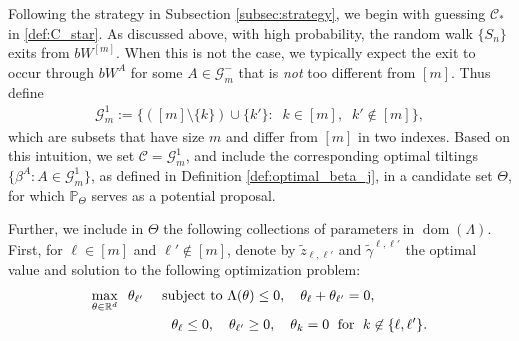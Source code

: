 \documentclass[aap,preprint]{imsart}
\newcommand{\Mstar}{[m]}
\newcommand{\Pro}{{\mathbb{P}}}
\newcommand{\bR}{{\mathbb{R}}}
\theoremstyle{plain}
\theoremstyle{definition}
\begin{document}
Following the strategy in Subsection \ref{subsec:strategy}, we begin with guessing $\mathcal{C}_*$ in \eqref{def:C_star}. As discussed above, with high probability, the random walk $\{S_n\}$ exits from $bW^{\Mstar}$. 
When this is not the case, we typically expect the exit to occur through $bW^{A}$ for some 
$A \in \mathcal{G}_m^{-}$ that is \emph{not} too different from  $\Mstar$. Thus define
\begin{align*}
    \mathcal{G}_{m}^{1}  :=  \{(\Mstar \setminus \{k\}) \cup \{k'\}:\;\; k \in \Mstar, \;\; k' \not \in \Mstar\},
\end{align*}
which are subsets that have size $m$ and differ from  $\Mstar$ in two indexes. Based on this intuition, we set $\mathcal{C} = \mathcal{G}_{m}^{1}$, and include the corresponding optimal tiltings $\{\beta^{A} : A \in \mathcal{G}_{m}^{1}\}$, as defined in Definition \ref{def:optimal_beta_j}, in a candidate set $\Theta$, for which   $\Pro_{\Theta}$ serves as a potential proposal.

Further, we include in $\Theta$ the following collections of parameters in $\operatorname{dom}(\Lambda)$.  First,
for $\ell \in \Mstar$ and $\ell' \not\in \Mstar$, denote by $\tilde{z}_{\ell,\ell'}$ and $\tilde{\gamma}^{\ell,\ell'}$ the optimal value and solution to the following optimization problem:
\begin{align}\label{gap:2index_opt}
\begin{split}
 \max_{\theta \in \bR^d} \;\;  \theta_{\ell'} \quad &\textup{ subject to }   \Lambda(\theta) \leq 0, \quad  \theta_{\ell} + \theta_{\ell'} = 0, \\
& \quad \theta_{\ell} \leq 0, \quad \theta_{\ell'} \geq 0,\quad 
\theta_k = 0\; \text{ for } \;k \not\in \{\ell,\ell'\}.
\end{split}
\end{align}
\end{document}
